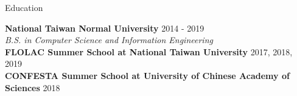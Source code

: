 \documentclass{resume} %
\begin{document}

\begin{rSection}{Education}

{\bf National Taiwan Normal University} \hfill {2014 - 2019} \\
{\em B.S. in Computer Science and Information Engineering} \\
{\bf FLOLAC Summer School at National Taiwan University} \hfill {2017, 2018, 2019} \\
{\bf CONFESTA Summer School at University of Chinese Academy of Sciences} \hfill {2018}

\end{rSection}

\end{document}
